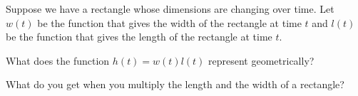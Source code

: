 \documentclass{ximera}
\begin{document}
\begin{question}
Suppose we have a rectangle whose dimensions are changing over time. Let $w(t)$ be the function that gives the width of the rectangle at time $t$ and $l(t)$ be the function that gives the length of the rectangle at time $t$.

What does the function $h(t)=w(t)l(t)$ represent geometrically?

\begin{hint}
What do you get when you multiply the length and the width of a rectangle? 
\end{hint}
\begin{multipleChoice}
\end{multipleChoice}

\end{question}
\end{document}
